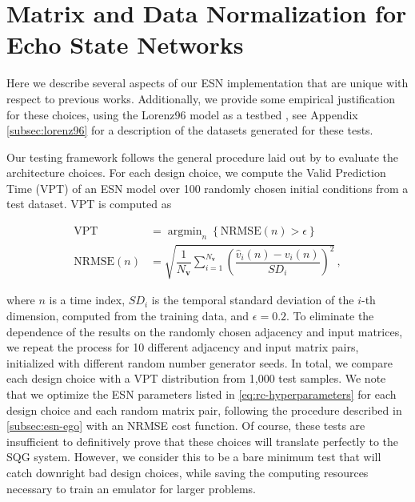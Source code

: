 \documentclass[draft]{agujournal2019}
\newcommand{\state}{\mathbf{v}}
\DeclareMathOperator*{\argmin}{argmin}
\newcommand{\nstate}{N_{\state}}
\newcommand{\citep}{\cite}
\newcommand{\citet}{\citeA}
\begin{document}
\appendix
\section{Matrix and Data Normalization for Echo State Networks}
\label{sec:new_methods}

Here we describe several aspects of our ESN implementation that are
unique with respect to previous works.
Additionally, we provide some empirical justification for these choices, using
the Lorenz96 model as a testbed \citep{lorenz_predictability_1996}, see
Appendix \cref{subsec:lorenz96} for a description of the datasets generated for these
tests.

Our testing framework follows the general procedure laid out
by \citet{platt_systematic_2022} to evaluate the architecture choices.
For each design choice, we compute the Valid Prediction Time (VPT) of
an ESN model over 100 randomly chosen initial conditions from a test dataset.
VPT is computed as
\begin{linenomath*}\begin{equation*}
    \begin{aligned}
        \text{VPT} &= \argmin_{n} \left\{ \text{NRMSE}(n) > \epsilon \right\} \\
        \text{NRMSE}(n) &= \sqrt{\dfrac{1}{\nstate}\sum_{i=1}^{\nstate}\left(
            \dfrac{\hat{v}_i(n) - v_i(n)}{SD_i}
            \right)^2
        } \, ,
    \end{aligned}
\end{equation*}\end{linenomath*}
where $n$ is a time index, $SD_i$ is the temporal standard deviation of the $i$-th dimension,
computed from the training data, and $\epsilon=0.2$.
To eliminate the dependence of the results on the randomly chosen adjacency and
input matrices, we repeat the process for 10 different adjacency and input
matrix pairs, initialized with different random number generator seeds.
In total, we compare each design choice with a VPT distribution from 1,000 test samples.
We note that we optimize the ESN parameters listed in
\cref{eq:rc-hyperparameters} for each design choice and each random matrix pair,
following the procedure described in \cref{subsec:esn-ego} with an NRMSE cost
function.
Of course, these tests are insufficient to definitively prove that these choices
will translate perfectly to the SQG system.
However, we consider this to be a bare minimum test that will catch downright bad
design choices, while saving the computing resources necessary to train an
emulator for larger problems.
\end{document}
